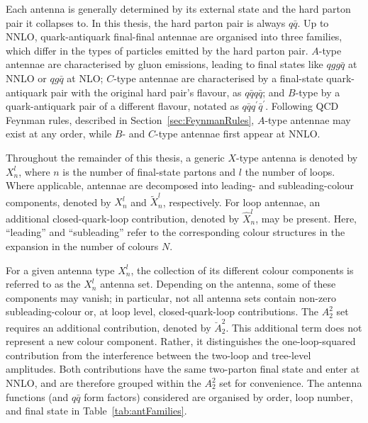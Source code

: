 Each antenna is generally determined by its external state and the hard 
parton pair it collapses to. In this thesis, the hard parton pair is 
always $q\bar q$. Up to NNLO, quark-antiquark final-final antennae are 
organised into three families, which differ in the types of particles emitted by the hard parton pair. $A$-type antennae are characterised by 
gluon emissions, leading to final states like $qgg\bar q$ at NNLO or $qg\bar q$
at NLO; $C$-type antennae are characterised by a final-state quark-antiquark pair 
with the original hard pair's flavour, as $q\bar qq\bar q$; and $B$-type 
by a quark-antiquark pair of a different flavour, notated as 
$q\bar qq^\prime\bar q^\prime$. Following QCD Feynman rules, described in
Section~\ref{sec:FeynmanRules}, $A$-type antennae may exist at any order, 
while $B$- and $C$-type antennae first appear at NNLO.

Throughout the remainder of this thesis, a generic $X$-type antenna is denoted
by $X_n^l$, where $n$ is the number of final-state partons and $l$ the number
of loops. Where applicable, antennae are decomposed into leading- and
subleading-colour components, denoted by $X_n^l$ and $\tilde X_n^l$,
respectively. For loop antennae, an additional closed-quark-loop contribution,
denoted by $\hat X_n^l$, may be present. Here, ``leading'' and ``subleading''
refer to the corresponding colour structures in the expansion in the number of
colours $N$.

For a given antenna type $X_n^l$, the collection of its different colour
components is referred to as the $X_n^l$ antenna set. Depending on the
antenna, some of these components may vanish; in particular, not all antenna
sets contain non-zero subleading-colour or, at loop level, closed-quark-loop
contributions. The $A_2^2$ set requires an additional contribution, denoted by
$\breve A_2^2$. This additional term does not represent a new colour
component. Rather, it distinguishes the one-loop-squared contribution from the
interference between the two-loop and tree-level amplitudes. Both
contributions have the same two-parton final state and enter at NNLO, and are
therefore grouped within the $A_2^2$ set for convenience.
The antenna functions (and $q\bar q$ form factors) considered are organised by order,
loop number, and final state in Table~\ref{tab:antFamilies}.

